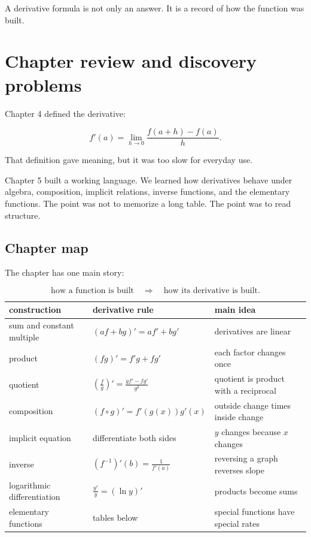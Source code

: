 A derivative formula is not only an answer.  It is a record of how the function was built.

\section{Chapter review and discovery problems}
\label{sec:chapter-review-differentiation-rules}

Chapter 4 defined the derivative:

\[
f'(a)=\lim_{h\to0}\frac{f(a+h)-f(a)}{h}.
\]

That definition gave meaning, but it was too slow for everyday use.

Chapter 5 built a working language.  We learned how derivatives behave under algebra, composition, implicit relations, inverse functions, and the elementary functions.  The point was not to memorize a long table.  The point was to read structure.

\subsection{Chapter map}
\label{subsec:chapter-5-map}

The chapter has one main story:

\[
\text{how a function is built}
\quad\Longrightarrow\quad
\text{how its derivative is built}.
\]

\begin{center}
\renewcommand{\arraystretch}{1.4}
\begin{tabular}{p{}|p{}|p{}}
\textbf{construction} & \textbf{derivative rule} & \textbf{main idea} \\ \hline
sum and constant multiple
&
\((af+bg)'=af'+bg'\)
&
derivatives are linear \\ \hline

product
&
\((fg)'=f'g+fg'\)
&
each factor changes once \\ \hline

quotient
&
\(\displaystyle \left(\frac fg\right)'=\frac{gf'-fg'}{g^2}\)
&
quotient is product with a reciprocal \\ \hline

composition
&
\((f\circ g)'=f'(g(x))g'(x)\)
&
outside change times inside change \\ \hline

implicit equation
&
differentiate both sides
&
\(y\) changes because \(x\) changes \\ \hline

inverse
&
\(\displaystyle (f^{-1})'(b)=\frac1{f'(a)}\)
&
reversing a graph reverses slope \\ \hline

logarithmic differentiation
&
\(\displaystyle \frac{y'}y=(\ln y)'\)
&
products become sums \\ \hline

elementary functions
&
tables below
&
special functions have special rates
\end{tabular}
\end{center}

